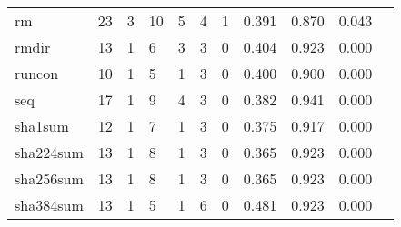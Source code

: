 \begin{longtable}{lp{1.10cm}p{1.10cm}p{1.10cm}p{1.10cm}p{1.10cm}p{1.10cm}p{1.10cm}p{1.10cm}p{1.10cm}p{1.10cm}}
rm        &                     23 &                                  3 &                                10 &                                5 &                                 4 &                               1 &                          0.391 &                                 0.870 &                               0.043 \\
rmdir     &                     13 &                                  1 &                                 6 &                                3 &                                 3 &                               0 &                          0.404 &                                 0.923 &                               0.000 \\
runcon    &                     10 &                                  1 &                                 5 &                                1 &                                 3 &                               0 &                          0.400 &                                 0.900 &                               0.000 \\
seq       &                     17 &                                  1 &                                 9 &                                4 &                                 3 &                               0 &                          0.382 &                                 0.941 &                               0.000 \\
sha1sum   &                     12 &                                  1 &                                 7 &                                1 &                                 3 &                               0 &                          0.375 &                                 0.917 &                               0.000 \\
sha224sum &                     13 &                                  1 &                                 8 &                                1 &                                 3 &                               0 &                          0.365 &                                 0.923 &                               0.000 \\
sha256sum &                     13 &                                  1 &                                 8 &                                1 &                                 3 &                               0 &                          0.365 &                                 0.923 &                               0.000 \\
sha384sum &                     13 &                                  1 &                                 5 &                                1 &                                 6 &                               0 &                          0.481 &                                 0.923 &                               0.000 \\

\end{longtable}

